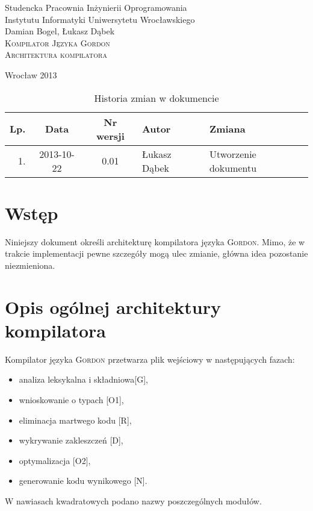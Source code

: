 \documentclass{documentation}
\begin{document}
\begin{titlepage}
\begin{center}
Studencka Pracownia Inżynierii Oprogramowania\\
Instytutu Informatyki Uniwersytetu Wrocławskiego\\[6cm]

Damian Bogel, Łukasz Dąbek\\[1cm]
\textsc{\LARGE Kompilator Języka Gordon}\\[0.5cm]
\textsc{\large Architektura kompilatora}

\vfill
Wrocław 2013 \\[2.5cm]

\end{center}
\end{titlepage}

\newpage
\begin{table}
	\centering
	\caption{Historia zmian w dokumencie}
		\begin{tabular}{|r|c|c|l|l|}
		\hline
		Lp.  & Data       & Nr wersji & Autor                 & Zmiana \\ \hline
		1.   & 2013-10-22 & 0.01 & Łukasz Dąbek & Utworzenie dokumentu \\ \hline
	\end{tabular}
\end{table}
\newpage

\tableofcontents
\setcounter{page}{2}

\newpage

\section{Wstęp}
\noindent Niniejszy dokument określi architekturę kompilatora języka \textsc{Gordon}. Mimo, że
w trakcie implementacji pewne szczegóły mogą ulec zmianie, główna idea pozostanie
niezmieniona.

\section{Opis ogólnej architektury kompilatora}
\noindent Kompilator języka \textsc{Gordon} przetwarza plik wejściowy w następujących fazach:
\begin{itemize}
    \item analiza leksykalna i składniowa[G],
    \item wnioskowanie o typach [O1],
    \item eliminacja martwego kodu [R],
    \item wykrywanie zakleszczeń [D], 
    \item optymalizacja [O2],
    \item generowanie kodu wynikowego [N].
\end{itemize}
W nawiasach kwadratowych podano nazwy poszczególnych modułów.
\end{document}
